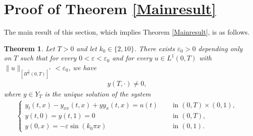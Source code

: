 \documentclass[11pt, reqno]{amsart}
\theoremstyle{plain}
\newtheorem{theorem}[thm]{Theorem}
\numberwithin{equation}{section}
\begin{document}
\section{Proof of Theorem \ref{Mainresult}}	\label{provemainsresult}


The main result of this section, which implies Theorem \ref{Mainresult}, is as follows. 
  
    \begin{theorem}     \label{coercivity->obstruction}
        Let $T > 0$ and let $k_0 \in \{2, 10\}$. There exists $\varepsilon_0 > 0$ depending only on $T$ such that for every $0 < \varepsilon < \varepsilon_0$ and for every $u \in L^1(0, T)$ with $\|u\|_{[H^{\frac{3}{4}}(0, T)]^*} < \varepsilon_0$, we have
            \begin{align*}
                y\left(T, \cdot\right) \neq 0,
            \end{align*}
            where $y \in Y_{T}$ is the unique solution of the system
        \begin{align}   \label{Burgersdetailed}
            \begin{cases}
                y_t(t, x) - y_{xx} (t, x) + yy_x (t, x) = u(t) \quad &\text{ in } (0, T) \times (0, 1), \\
                y(t, 0) = y(t, 1) = 0 &\text{ in } (0, T), \\
                y(0, x) =  - \varepsilon \sin (k_0 \pi x) &\text{ in } (0, 1).
            \end{cases}
        \end{align}        
    \end{theorem}
\end{document}
